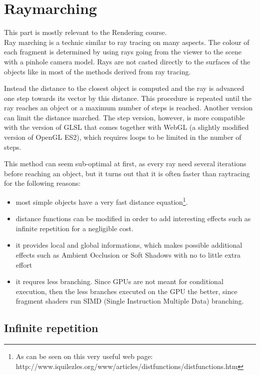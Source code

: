 \chapter{Raymarching \label{chap:raymarching} }
This part is mostly relevant to the Rendering course.
~\\
Ray marching is a technic similar to ray tracing on many aspects. The colour of
each fragment is determined by using rays going from the viewer to the scene with
a pinhole camera model. Rays are not casted directly to the surfaces of the objects
like in most of the methods derived from ray tracing.

Instead the distance to the closest object is computed and the ray is advanced one step towards
its vector by this distance. This procedure is repeated
until the ray reaches an object or a maximum number of steps is reached. Another version can limit
the distance marched. The step version, however, is more compatible with the version
of GLSL that comes together with WebGL (a slightly modified version of OpenGL ES2), which requires
loops to be limited in the number of steps. 

This method can seem sub-optimal at first, as every ray need several iterations before reaching an object,
but it turns out that it is often faster than raytracing for the following reasons:
\begin{itemize}
 \item most simple objects have a very fast distance equation\footnote{As can be seen on this
 	very useful web page: http://www.iquilezles.org/www/articles/distfunctions/distfunctions.htm}.
 \item distance functions can be modified in order to add interesting effects such as
	infinite repetition for a negligible cost.
 \item it provides local and global informations, which makes possible additional effects
 	such as Ambient Occlusion or Soft Shadows with no to little extra effort
 \item it requres less branching. Since GPUs are not meant for conditional execution, then
 	the less branches executed on the GPU the better, since fragment shaders run SIMD
 	(Single Instruction Multiple Data) branching.
\end{itemize}


\section{Infinite repetition} 

